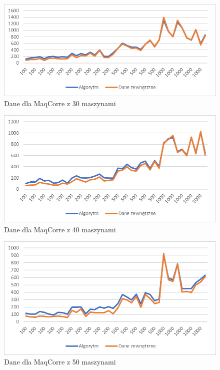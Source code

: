\begin{figure}[h]
    \centering
    \includegraphics[scale=0.3]{moq_30.png}
    \caption{Dane dla MaqCorre z 30 maszynami}
    \label{moq_30}
\end{figure}

\begin{figure}[h]
    \centering
    \includegraphics[scale=0.3]{moq_40.png}
    \caption{Dane dla MaqCorre z 40 maszynami}
    \label{moq_40}
\end{figure}

\begin{figure}[h]
    \centering
    \includegraphics[scale=0.3]{moq_50.png}
    \caption{Dane dla MaqCorre z 50 maszynami}
    \label{moq_50}
\end{figure}
